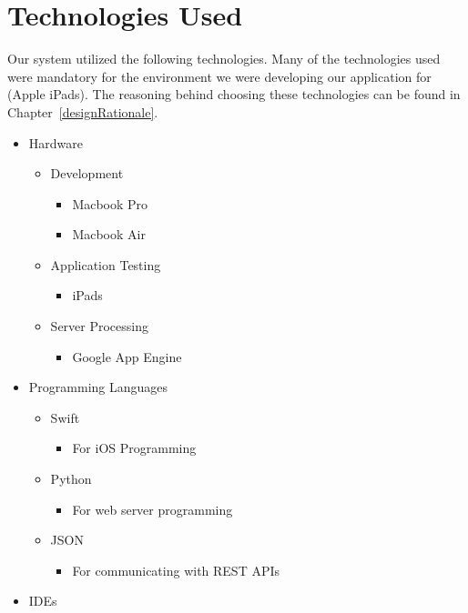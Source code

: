 \chapter{Technologies Used}

Our system utilized the following technologies. Many of the technologies used were mandatory for the environment we were developing our application for (Apple iPads). The reasoning behind choosing these technologies can be found in Chapter~\ref{designRationale}.

\begin{itemize}
    \item Hardware
    \begin{itemize}
   	 \item Development
	 \begin{itemize}
   	 	\item Macbook Pro
		\item Macbook Air
	\end{itemize}
	 \item Application Testing
	  \begin{itemize}
   	 	\item iPads
	\end{itemize}
	 \item Server Processing
	  \begin{itemize}
		\item Google App Engine
	\end{itemize}
    \end{itemize}
    \item Programming Languages
     \begin{itemize}
   	 	\item Swift
		 \begin{itemize}
   	 		\item For iOS Programming
		\end{itemize}
		\item Python
		 \begin{itemize}
   	 		\item For web server programming
		\end{itemize}
		\item JSON
		\begin{itemize}
   	 		\item For communicating with REST APIs
		\end{itemize}
	\end{itemize}
    \item IDEs
     \begin{itemize}

\end{itemize}
\end{itemize}
